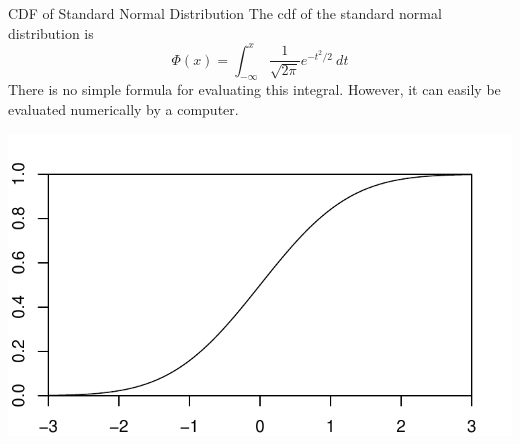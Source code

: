 \documentclass{beamer}
\begin{document}
\begin{frame}{CDF of Standard Normal Distribution}
The cdf of the standard normal distribution is
$$\Phi(x)=\int_{-\infty}^x \frac1{\sqrt{2\pi}}e^{-t^2/2}\ dt$$
There is no simple formula for evaluating this integral. However, it can easily be evaluated numerically by a computer.
\begin{center}
\includegraphics[scale=.5]{ch4_cdf_norm2.pdf}
\end{center}
\end{frame}
\end{document}
